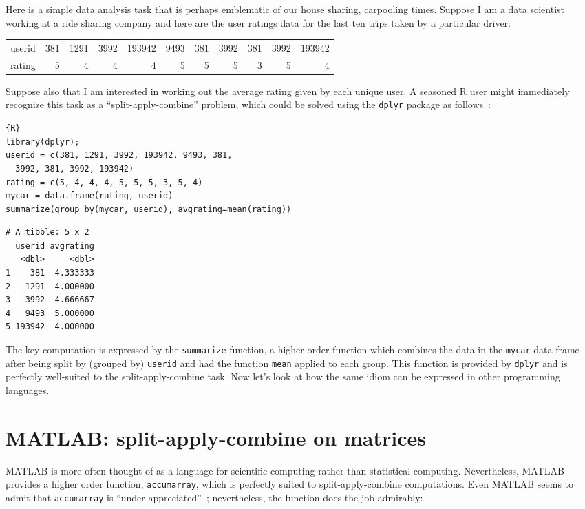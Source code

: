 \documentclass[11pt]{asaproc}
\begin{document}
Here is a simple data analysis task that is perhaps emblematic of our house
sharing, carpooling times. Suppose I am a data scientist working at a ride
sharing company and here are the user ratings data for the last ten trips taken
by a particular driver:

\begin{tabular}{r|rrrrrrrrrr}
userid &
381    & 1291   & 3992   & 193942 & 9493   &
381    & 3992   & 381    & 3992   & 193942 \tabularnewline
rating &
5 & 4 & 4 & 4 & 5 & 5 & 5 & 3 & 5 & 4
\end{tabular}

Suppose also that I am interested in working out the average rating given by
each unique user. A seasoned R user might immediately recognize this task
as a ``split-apply-combine'' problem, which could be solved using the
\lstinline|dplyr| package as follows~\cite{Wickham2011}:

\begin{lstlisting}{R}
library(dplyr);
userid = c(381, 1291, 3992, 193942, 9493, 381,
  3992, 381, 3992, 193942)
rating = c(5, 4, 4, 4, 5, 5, 5, 3, 5, 4)
mycar = data.frame(rating, userid)
summarize(group_by(mycar, userid), avgrating=mean(rating))
\end{lstlisting}
\begin{verbatim}
# A tibble: 5 x 2
  userid avgrating
   <dbl>     <dbl>
1    381  4.333333
2   1291  4.000000
3   3992  4.666667
4   9493  5.000000
5 193942  4.000000
\end{verbatim}

The key computation is expressed by the \lstinline|summarize| function, a
higher-order function which combines the data in the \lstinline|mycar| data
frame after being split by (grouped by) \lstinline|userid| and had the function
\lstinline|mean| applied to each group.  This function is provided by
\lstinline|dplyr| and is perfectly well-suited to the split-apply-combine task.
Now let's look at how the same idiom can be expressed in other programming
languages.



\section{MATLAB: split-apply-combine on matrices}

MATLAB is more often thought of as a language for scientific computing rather
than statistical computing. Nevertheless, MATLAB provides a higher order
function, \lstinline|accumarray|, which is perfectly suited to
split-apply-combine computations. Even MATLAB seems to admit that
\lstinline|accumarray| is ``under-appreciated''~\cite{underappreciated};
nevertheless, the function does the job admirably:
\end{document}
